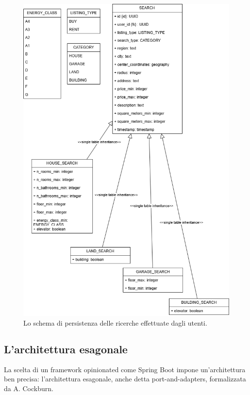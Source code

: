 \begin{figure}[H]
    \centering
    \includegraphics[width=\textwidth]{assets/diagrams/db-scheme/search.png}
    \caption{Lo schema di persistenza delle ricerche effettuate dagli utenti.}
    \label{fig:Schema di persistenza delle ricerche effettuate dagli utenti}
\end{figure}

\subsection{L'architettura esagonale}
La scelta di un framework opinionated come Spring Boot impone un’architettura ben precisa: 
l'architettura esagonale, anche detta port-and-adapters, formalizzata da A. Cockburn.

